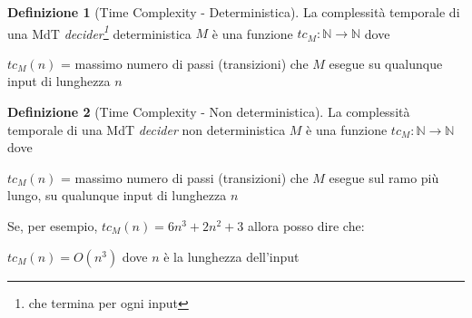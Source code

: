 \documentclass{article}  %
\theoremstyle{definition}
\newtheorem{definition}{Definizione}[section]
\begin{document}
\begin{definition}[Time Complexity - Deterministica]
	La complessità temporale di una MdT \textit{decider\footnote{che termina per ogni input}} deterministica $M$ è una funzione $tc_M:\mathbb{N}\rightarrow\mathbb{N}$ dove
	\begin{center}
		\footnotesize
		$tc_M(n)$ = massimo numero di passi (transizioni) che $M$ esegue su qualunque input di lunghezza $n$
	\end{center}
\end{definition}
\begin{definition}[Time Complexity - Non deterministica]
	La complessità temporale di una MdT \textit{decider} non deterministica $M$ è una funzione $tc_M:\mathbb{N}\rightarrow\mathbb{N}$ dove
	\begin{center}
		\footnotesize
		$tc_M(n)$ = massimo numero di passi (transizioni) che $M$ esegue sul ramo più lungo, su qualunque input di lunghezza $n$
	\end{center}
\end{definition}
\begin{esempio}
	\footnotesize
	Se, per esempio, $tc_M(n)=6n^3+2n^2+3$ allora posso dire che:
	\begin{center}
		$tc_M(n)=O(n^3)$ dove $n$ è la lunghezza dell'input
	\end{center}
\end{esempio}
\end{document}
